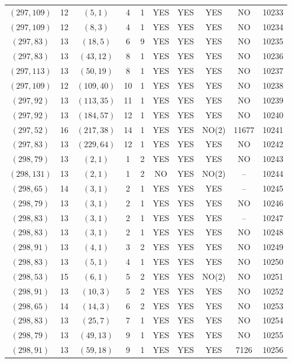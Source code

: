 \begin{longtable}{|c|c|c|c|c|c|c|c|c|c|}
$(297, 109)$ & 12 & $(5, 1)$ & 4 & 1 & YES & YES & YES & NO & 10233\\
$(297, 109)$ & 12 & $(8, 3)$ & 4 & 1 & YES & YES & YES & NO & 10234\\
$(297, 83)$ & 13 & $(18, 5)$ & 6 & 9 & YES & YES & YES & NO & 10235\\
$(297, 83)$ & 13 & $(43, 12)$ & 8 & 1 & YES & YES & YES & NO & 10236\\
$(297, 113)$ & 13 & $(50, 19)$ & 8 & 1 & YES & YES & YES & NO & 10237\\
$(297, 109)$ & 12 & $(109, 40)$ & 10 & 1 & YES & YES & YES & NO & 10238\\
$(297, 92)$ & 13 & $(113, 35)$ & 11 & 1 & YES & YES & YES & NO & 10239\\
$(297, 92)$ & 13 & $(184, 57)$ & 12 & 1 & YES & YES & YES & NO & 10240\\
$(297, 52)$ & 16 & $(217, 38)$ & 14 & 1 & YES & YES & NO(2) & 11677 & 10241\\
$(297, 83)$ & 13 & $(229, 64)$ & 12 & 1 & YES & YES & YES & NO & 10242\\
$(298, 79)$ & 13 & $(2, 1)$ & 1 & 2 & YES & YES & YES & NO & 10243\\
$(298, 131)$ & 13 & $(2, 1)$ & 1 & 2 & NO & YES & NO(2) & -- & 10244\\
$(298, 65)$ & 14 & $(3, 1)$ & 2 & 1 & YES & YES & YES & -- & 10245\\
$(298, 79)$ & 13 & $(3, 1)$ & 2 & 1 & YES & YES & YES & NO & 10246\\
$(298, 83)$ & 13 & $(3, 1)$ & 2 & 1 & YES & YES & YES & -- & 10247\\
$(298, 83)$ & 13 & $(3, 1)$ & 2 & 1 & YES & YES & YES & NO & 10248\\
$(298, 91)$ & 13 & $(4, 1)$ & 3 & 2 & YES & YES & YES & NO & 10249\\
$(298, 83)$ & 13 & $(5, 1)$ & 4 & 1 & YES & YES & YES & NO & 10250\\
$(298, 53)$ & 15 & $(6, 1)$ & 5 & 2 & YES & YES & NO(2) & NO & 10251\\
$(298, 91)$ & 13 & $(10, 3)$ & 5 & 2 & YES & YES & YES & NO & 10252\\
$(298, 65)$ & 14 & $(14, 3)$ & 6 & 2 & YES & YES & YES & NO & 10253\\
$(298, 83)$ & 13 & $(25, 7)$ & 7 & 1 & YES & YES & YES & NO & 10254\\
$(298, 79)$ & 13 & $(49, 13)$ & 9 & 1 & YES & YES & YES & NO & 10255\\
$(298, 91)$ & 13 & $(59, 18)$ & 9 & 1 & YES & YES & YES & 7126 & 10256\\

\end{longtable}
